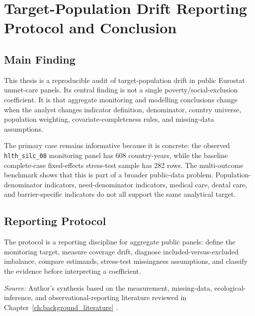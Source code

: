 \chapter{Target-Population Drift Reporting Protocol and Conclusion}
\label{ch:discussion_conclusion}

\section{Main Finding}

This thesis is a reproducible audit of target-population drift in public Eurostat unmet-care panels. Its central finding is not a single poverty/social-exclusion coefficient. It is that aggregate monitoring and modelling conclusions change when the analyst changes indicator definition, denominator, country universe, population weighting, covariate-completeness rules, and missing-data assumptions.

The primary case remains informative because it is concrete: the observed \texttt{hlth\_silc\_08} monitoring panel has 608 country-years, while the baseline complete-case fixed-effects stress-test sample has 282 rows. The multi-outcome benchmark shows that this is part of a broader public-data problem. Population-denominator indicators, need-denominator indicators, medical care, dental care, and barrier-specific indicators do not all support the same analytical target.

\section{Reporting Protocol}

The protocol is a reporting discipline for aggregate public panels: define the monitoring target, measure coverage drift, diagnose included-versus-excluded imbalance, compare estimands, stress-test missingness assumptions, and classify the evidence before interpreting a coefficient.

\begin{table}[H]
\centering
\scriptsize
\caption{Target-population drift reporting checklist. The protocol is a structured audit for public aggregate health-monitoring panels and does not introduce a new estimator.}
\label{tab:target_population_drift_reporting_checklist}


\vspace{0.35em}
\begin{minipage}{0.94\textwidth}
\scriptsize \textit{Source:} Author's synthesis based on the measurement, missing-data, ecological-inference, and observational-reporting literature reviewed in Chapter~\ref{ch:background_literature} \citep{von_elm_altman_egger_2007_strobe,little_rubin_2019,robinson_1950}.
\end{minipage}
\end{table}


